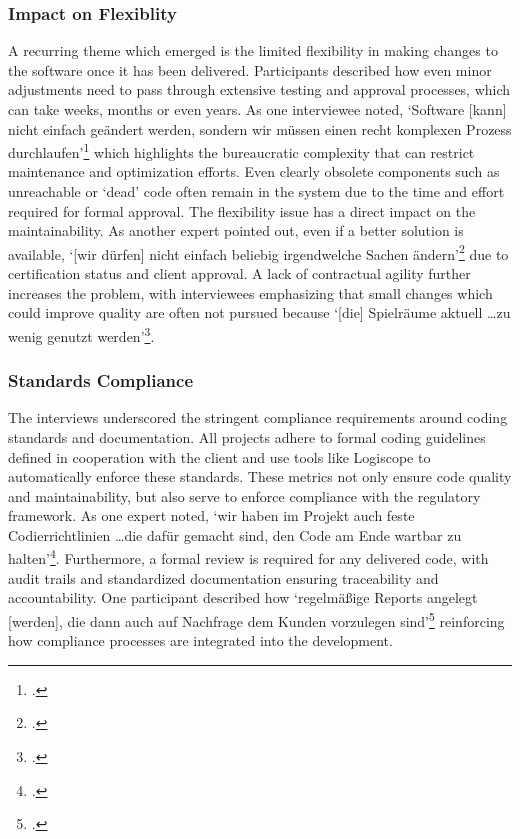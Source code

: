 \subsubsection{Impact on Flexiblity}
A recurring theme which emerged is the limited flexibility in making changes to the software once it has been delivered. Participants described how even minor adjustments need to pass through extensive testing and approval processes, which can take weeks, months or even years.
As one interviewee noted, `Software [kann] nicht einfach geändert werden, sondern wir müssen einen recht komplexen Prozess durchlaufen'\footcite{Interview22025} which highlights the bureaucratic complexity that can restrict maintenance and optimization efforts. Even clearly obsolete components such as unreachable or `dead' code
often remain in the system due to the time and effort required for formal approval.
The flexibility issue has a direct impact on the maintainability. As another expert pointed out, even if a better solution is available, `[wir dürfen] nicht einfach beliebig irgendwelche Sachen ändern'\footcite{Interview32025} due to certification status and client approval. A lack of contractual agility further increases the problem,
with interviewees emphasizing that small changes which could improve quality are often not pursued because `[die] Spielräume aktuell \ldots zu wenig genutzt werden'\footcite{Interview32025}.

\subsubsection{Standards Compliance}
The interviews underscored the stringent compliance requirements around coding standards and documentation. All projects adhere to formal coding guidelines defined in cooperation with the client and use tools like Logiscope to automatically enforce these standards.
These metrics not only ensure code quality and maintainability, but also serve to enforce compliance with the regulatory framework. As one expert noted, `wir haben im Projekt auch feste Codierrichtlinien \ldots die dafür gemacht sind, den Code am Ende wartbar zu halten'\footcite{Interview22025}.
Furthermore, a formal review is required for any delivered code, with audit trails and standardized documentation ensuring traceability and accountability. One participant described how `regelmäßige Reports angelegt [werden], die dann auch auf Nachfrage dem Kunden vorzulegen sind'\footcite{Interview22025} reinforcing how compliance processes are integrated into the development.

